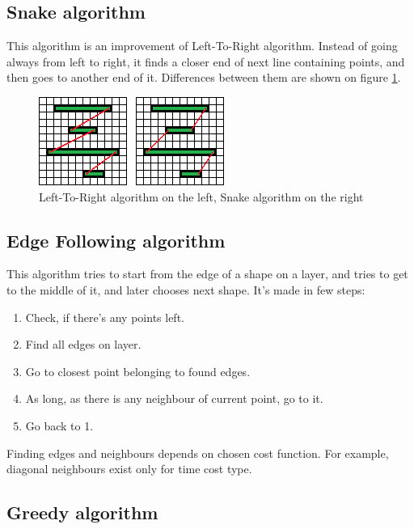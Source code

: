 \documentclass[titlepage]{article}
\begin{document}
\subsection{Snake algorithm}
This algorithm is an improvement of Left-To-Right algorithm. Instead of going always from left to right, it finds a closer end of next line containing points, and then goes to another end of it. Differences between them are shown on figure \ref{img:ltr-vs-snake}.

\begin{figure}
\begin{center}
\includegraphics[scale=2]{img/ltr-vs-snake}
\caption{Left-To-Right algorithm on the left, Snake algorithm on the right}
\label{img:ltr-vs-snake}
\end{center}
\end{figure}

\subsection{Edge Following algorithm}
This algorithm tries to start from the edge of a shape on a layer, and tries to get to the middle of it, and later chooses next shape.
It's made in few steps:
\begin{enumerate}
\item Check, if there's any points left.
\item Find all edges on layer.
\item Go to closest point belonging to found edges.
\item As long, as there is any neighbour of current point, go to it.
\item Go back to 1.
\end{enumerate}
Finding edges and neighbours depends on chosen cost function. For example, diagonal neighbours exist only for time cost type.


\subsection{Greedy algorithm}
\end{document}
